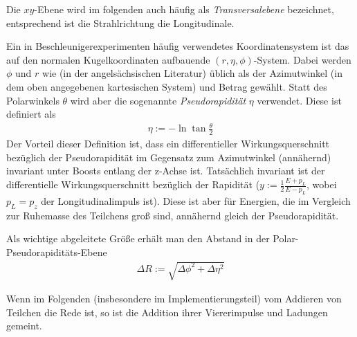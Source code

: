 Die $xy$-Ebene wird im folgenden auch häufig als \emph{Transversalebene}
bezeichnet, entsprechend ist die Strahlrichtung die Longitudinale.

Ein in Beschleunigerexperimenten häufig verwendetes Koordinatensystem ist das
auf den normalen Kugelkoordinaten aufbauende $(r, \eta, \phi)$-System.  Dabei
werden $\phi$ und $r$ wie (in der angelsächsischen Literatur) üblich als der
Azimutwinkel (in dem oben angegebenen kartesischen System) und Betrag gewählt.
Statt des Polarwinkels $\theta$ wird aber die sogenannte \emph{Pseudorapidität}
$\eta$ verwendet. Diese ist definiert als
\begin{align}
  \eta := -\ln{\tan{\frac \theta 2}}
\end{align}
Der Vorteil dieser Definition ist, dass ein differentieller Wirkungsquerschnitt
bezüglich der Pseudorapidität im Gegensatz zum Azimutwinkel (annähernd)
invariant unter Boosts entlang der z-Achse ist.  Tatsächlich invariant ist der
differentielle Wirkungsquerschnitt bezüglich der Rapidität ($y := \frac12
\frac{E + p_L}{E - p_L}$, wobei $p_L = p_z$ der Longitudinalimpuls ist). Diese
ist aber für Energien, die im Vergleich zur Ruhemasse des Teilchens groß sind,
annähernd gleich der Pseudorapidität.

Als wichtige abgeleitete Größe erhält man den Abstand in der
Polar-Pseudorapiditäts-Ebene
\begin{align}
  \Delta R := \sqrt{\Delta\phi^2 + \Delta\eta^2}
  \label{def:dr}
\end{align}

Wenn im Folgenden (insbesondere im Implementierungsteil) vom Addieren von
Teilchen die Rede ist, so ist die Addition ihrer Viererimpulse und Ladungen
gemeint.

